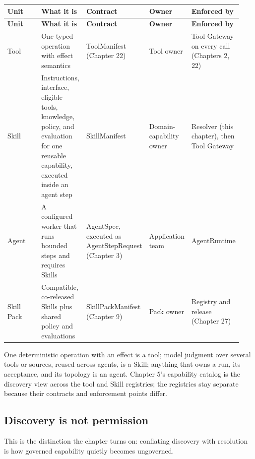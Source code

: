 \BookTableStart
\fontsize{7.2}{9}\selectfont
\begin{longtable}{@{}Y{0.1880\linewidth}Y{0.1880\linewidth}Y{0.1880\linewidth}Y{0.1880\linewidth}Y{0.1880\linewidth}@{}}
\color{white}\bfseries \textbf{Unit} & \color{white}\bfseries \textbf{What it is} & \color{white}\bfseries \textbf{Contract} & \color{white}\bfseries \textbf{Owner} & \color{white}\bfseries \textbf{Enforced by} \\
\endfirsthead
{}
\color{white}\bfseries \textbf{Unit} & \color{white}\bfseries \textbf{What it is} & \color{white}\bfseries \textbf{Contract} & \color{white}\bfseries \textbf{Owner} & \color{white}\bfseries \textbf{Enforced by} \\
\endhead
Tool & One typed operation with effect semantics & ToolManifest (Chapter 22) & Tool owner & Tool Gateway on every call (Chapters 2, 22) \\
Skill & Instructions, interface, eligible tools, knowledge, policy, and evaluation for one reusable capability, executed inside an agent step & SkillManifest & Domain-capability owner & Resolver (this chapter), then Tool Gateway \\
Agent & A configured worker that runs bounded steps and requires Skills & AgentSpec, executed as AgentStepRequest (Chapter 3) & Application team & AgentRuntime \\
Skill Pack & Compatible, co-released Skills plus shared policy and evaluations & SkillPackManifest (Chapter 9) & Pack owner & Registry and release (Chapter 27) \\
\end{longtable}
\BookTableEnd

One deterministic operation with an effect is a tool; model judgment over several tools or sources, reused across agents, is a Skill; anything that owns a run, its acceptance, and its topology is an agent. Chapter 5's capability catalog is the discovery view across the tool and Skill registries; the registries stay separate because their contracts and enforcement points differ.\par

\subsection{Discovery is not permission}

This is the distinction the chapter turns on: conflating discovery with resolution is how governed capability quietly becomes ungoverned.\par

